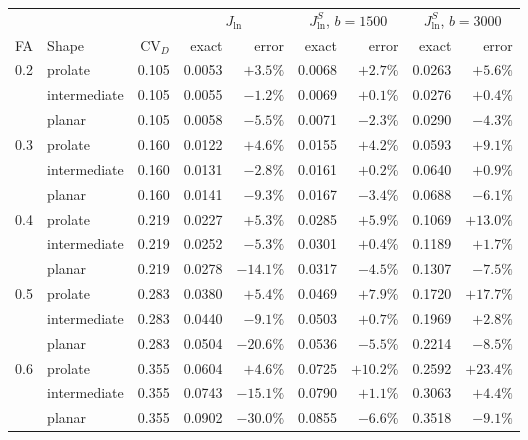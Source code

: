 \begin{tabular}{@{}llrrrrrrr@{}}
\toprule
 & & & \multicolumn{2}{c}{$J_{\ln}$} & \multicolumn{2}{c}{$J_{\ln}^{S}$, $b=1500$} & \multicolumn{2}{c}{$J_{\ln}^{S}$, $b=3000$}\\
\cmidrule(lr){4-5}\cmidrule(lr){6-7}\cmidrule(l){8-9}
FA & Shape & $\mathrm{CV}_D$ & exact & error & exact & error & exact & error\\
\midrule
0.2 & prolate & 0.105 & 0.0053 & $+3.5\%$ & 0.0068 & $+2.7\%$ & 0.0263 & $+5.6\%$\\
 & intermediate & 0.105 & 0.0055 & $-1.2\%$ & 0.0069 & $+0.1\%$ & 0.0276 & $+0.4\%$\\
 & planar & 0.105 & 0.0058 & $-5.5\%$ & 0.0071 & $-2.3\%$ & 0.0290 & $-4.3\%$\\
0.3 & prolate & 0.160 & 0.0122 & $+4.6\%$ & 0.0155 & $+4.2\%$ & 0.0593 & $+9.1\%$\\
 & intermediate & 0.160 & 0.0131 & $-2.8\%$ & 0.0161 & $+0.2\%$ & 0.0640 & $+0.9\%$\\
 & planar & 0.160 & 0.0141 & $-9.3\%$ & 0.0167 & $-3.4\%$ & 0.0688 & $-6.1\%$\\
0.4 & prolate & 0.219 & 0.0227 & $+5.3\%$ & 0.0285 & $+5.9\%$ & 0.1069 & $+13.0\%$\\
 & intermediate & 0.219 & 0.0252 & $-5.3\%$ & 0.0301 & $+0.4\%$ & 0.1189 & $+1.7\%$\\
 & planar & 0.219 & 0.0278 & $-14.1\%$ & 0.0317 & $-4.5\%$ & 0.1307 & $-7.5\%$\\
0.5 & prolate & 0.283 & 0.0380 & $+5.4\%$ & 0.0469 & $+7.9\%$ & 0.1720 & $+17.7\%$\\
 & intermediate & 0.283 & 0.0440 & $-9.1\%$ & 0.0503 & $+0.7\%$ & 0.1969 & $+2.8\%$\\
 & planar & 0.283 & 0.0504 & $-20.6\%$ & 0.0536 & $-5.5\%$ & 0.2214 & $-8.5\%$\\
0.6 & prolate & 0.355 & 0.0604 & $+4.6\%$ & 0.0725 & $+10.2\%$ & 0.2592 & $+23.4\%$\\
 & intermediate & 0.355 & 0.0743 & $-15.1\%$ & 0.0790 & $+1.1\%$ & 0.3063 & $+4.4\%$\\
 & planar & 0.355 & 0.0902 & $-30.0\%$ & 0.0855 & $-6.6\%$ & 0.3518 & $-9.1\%$\\
\bottomrule
\end{tabular}
